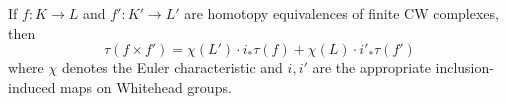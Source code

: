 If $f: K \to L$ and $f': K' \to L'$ are homotopy equivalences of finite CW complexes, then
$$\tau(f \times f') = \chi(L') \cdot i_* \tau(f) + \chi(L) \cdot i'_* \tau(f')$$
where $\chi$ denotes the Euler characteristic and $i, i'$ are the appropriate inclusion-induced maps on Whitehead groups.
